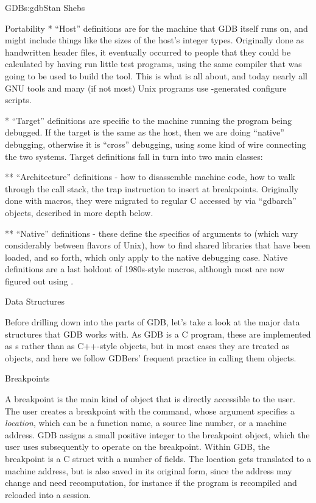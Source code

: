 \begin{aosachapter}{GDB}{s:gdb}{Stan Shebs}
\begin{aosasect1}{Portability}
* ``Host'' definitions are for the machine that GDB itself runs on,
and might include things like the sizes of the host's integer types.
Originally done as handwritten header files, it eventually occurred to
people that they could be calculated by having  run
little test programs, using the same compiler that was going to be
used to build the tool.  This is what
\cite{bib:autoconf} is all about, and today nearly all
GNU tools and many (if not most) Unix programs use
-generated configure scripts.

* ``Target'' definitions are specific to the machine running the
program being debugged.  If the target is the same as the host, then
we are doing ``native'' debugging, otherwise it is ``cross''
debugging, using some kind of wire connecting the two systems.  Target
definitions fall in turn into two main classes:

** ``Architecture'' definitions - how to disassemble machine code, how
to walk through the call stack, the trap instruction to insert at
breakpoints.  Originally done with macros, they were migrated to
regular C accessed by via ``gdbarch'' objects, described in more depth
below.

** ``Native'' definitions - these define the specifics of arguments to
 (which vary considerably between flavors of Unix), how
to find shared libraries that have been loaded, and so forth, which
only apply to the native debugging case.  Native definitions are a
last holdout of 1980s-style macros, although most are now figured out
using .

\end{aosasect1}

\begin{aosasect1}{Data Structures}

Before drilling down into the parts of GDB, let's take a look at the
major data structures that GDB works with.  As GDB is a C program,
these are implemented as s rather than as C++-style
objects, but in most cases they are treated as objects, and here we
follow GDBers' frequent practice in calling them objects.

\end{aosasect1}

\begin{aosasect2}{Breakpoints}

A breakpoint is the main kind of object that is directly accessible to
the user.  The user creates a breakpoint with the 
command, whose argument specifies a {\em location}, which can be a
function name, a source line number, or a machine address.  GDB
assigns a small positive integer to the breakpoint object, which the
user uses subsequently to operate on the breakpoint.  Within GDB, the
breakpoint is a C struct with a number of fields.  The location gets
translated to a machine address, but is also saved in its original
form, since the address may change and need recomputation, for
instance if the program is recompiled and reloaded into a session.


\end{aosasect2}
\end{aosachapter}
